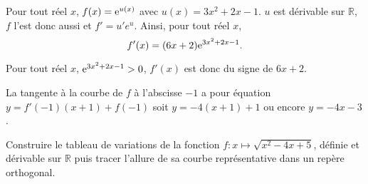 \documentclass[11pt,fleqn, openany]{book} %
\begin{document}
\begin{solution}Pour tout réel $x$, $f(x)=\mathrm{e}^{u(x)}$ avec $u(x)=3x^2+2x-1$. $u$ est dérivable sur $\mathbb{R}$, $f$ l'est donc aussi et $f'=u'e^u$. Ainsi, pour tout réel $x$, 
\[f'(x)=(6x+2)\mathrm{e}^{3x^2+2x-1}.\]

Pour tout réel $x$, $\mathrm{e}^{3x^2+2x-1}>0$, $f'(x)$ est donc du signe de $6x+2$.

\begin{center}
\end{center}

La tangente à la courbe de $f$ à l'abscisse $-1$ a pour équation $y=f'(-1)(x+1)+f(-1)$ soit $y=-4(x+1)+1$ ou encore $y=-4x-3$.\end{solution}




\begin{exercise}Construire le tableau de variations de la fonction $f:x\mapsto \sqrt{x^2-4x+5}$, définie et dérivable sur $\mathbb{R}$  puis tracer l'allure de sa courbe représentative dans un repère orthogonal.\end{exercise}
\end{document}
